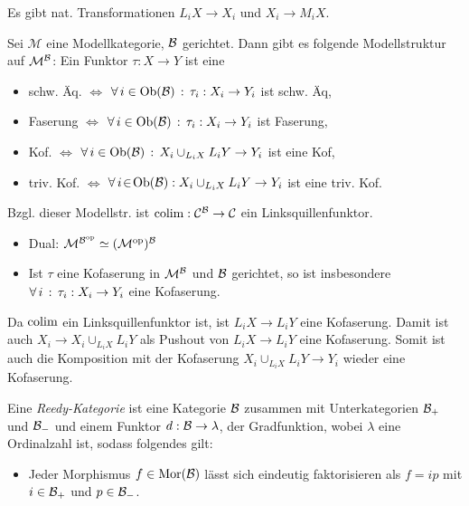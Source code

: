 \documentclass{cheat-sheet}
\newcommand{\ModC}{\mathcal{M}} %
\begin{document}
\begin{bem}
  Es gibt nat. Transformationen $L_i X \to X_i$ und $X_i \to M_i X$.
\end{bem}

\begin{satz}
  Sei $\ModC$ eine Modellkategorie, $\mathcal{B}$ gerichtet.
  Dann gibt es folgende Modellstruktur auf $\ModC^\Bat$: Ein Funktor $\tau : X \to Y$ ist eine
  \begin{itemize}
    \item schw. Äq. $\iff$ $\forall \, {i \in \operatorname{Ob}(\mathcal{B})} \,:\, \tau_i : X_i \to Y_i$ ist schw. Äq,
    \item Faserung $\iff$ $\forall \, {i \in \operatorname{Ob}(\mathcal{B})} \,:\, \tau_i : X_i \to Y_i$ ist Faserung,
    \item Kof. $\iff$ $\forall \, {i \in \operatorname{Ob}(\mathcal{B})} \,:\, X_i \cup_{L_i X} L_i Y \to Y_i$ ist eine Kof,
    \item triv. Kof. $\iff$ $\forall \, {i \!\in\! \operatorname{Ob}(\mathcal{B})\!} \,:\,\! X_i \cup_{L_i X} L_i Y \to Y_i$ ist eine triv. Kof.
  \end{itemize}
  Bzgl. dieser Modellstr. ist $\operatorname{colim} : \mathcal{C}^{\mathcal{B}} \to \mathcal{C}$ ein Linksquillenfunktor.
\end{satz}

\begin{bem}
  \begin{itemize}
    \item Dual: $\ModC^{\Bat^\op} \simeq (\ModC^\op)^\Bat$
    \item Ist $\tau$ eine Kofaserung in $\ModC^\Bat$ und $\mathcal{B}$ gerichtet, so ist insbesondere $\forall \, {i} \,:\, \tau_i : X_i \to Y_i$ eine Kofaserung.
  \end{itemize}
\end{bem}

\begin{beweis}
  Da $\operatorname{colim}$ ein Linksquillenfunktor ist, ist $L_i X \to L_i Y$ eine Kofaserung.
  Damit ist auch $X_i \to X_i \cup_{L_i X} L_i Y$ als Pushout von $L_i X \to L_i Y$ eine Kofaserung.
  Somit ist auch die Komposition mit der Kofaserung $X_i \cup_{L_i X} L_i Y \to Y_i$ wieder eine Kofaserung.
\end{beweis}


\begin{defn}
  Eine \emph{Reedy-Kategorie} ist eine Kategorie $\mathcal{B}$ zusammen mit Unterkategorien $\mathcal{B}_{+}$ und $\mathcal{B}_{-}$ und einem Funktor $d : \mathcal{B} \to \lambda$, der Gradfunktion, wobei $\lambda$ eine Ordinalzahl ist, sodass folgendes gilt:
  \begin{itemize}
    \item Jeder Morphismus $f \in \operatorname{Mor}(\mathcal{B})$ lässt sich eindeutig faktorisieren als $f = ip$ mit $i \in \mathcal{B}_{+}$ und $p \in \mathcal{B}_{-}$.
  \end{itemize}
\end{defn}
\end{document}
